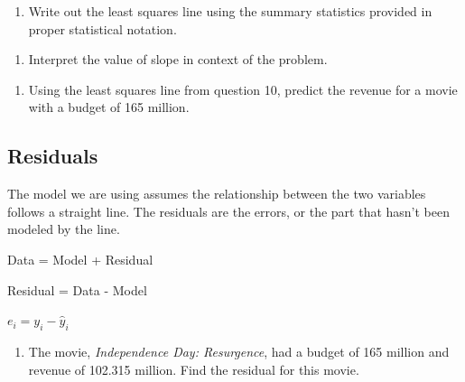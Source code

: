 \documentclass[
]{report}
\providecommand{\tightlist}{%
  \setlength{\itemsep}{0pt}\setlength{\parskip}{0pt}}
\begin{document}
\begin{enumerate}
\def\labelenumi{\arabic{enumi}.}
\setcounter{enumi}{9}
\tightlist
\item
  Write out the least squares line using the summary statistics provided in proper statistical notation.
\end{enumerate}

\vspace{.6in}

\begin{enumerate}
\def\labelenumi{\arabic{enumi}.}
\setcounter{enumi}{10}
\tightlist
\item
  Interpret the value of slope in context of the problem.
\end{enumerate}

\vspace{1in}

\begin{enumerate}
\def\labelenumi{\arabic{enumi}.}
\setcounter{enumi}{11}
\tightlist
\item
  Using the least squares line from question 10, predict the revenue for a movie with a budget of 165 million.
\end{enumerate}

\vspace{.6in}

\hypertarget{residuals}{%
\subsection*{Residuals}\label{residuals}}

The model we are using assumes the relationship between the two variables follows a straight line. The residuals are the errors, or the part that hasn't been modeled by the line.

\begin{center}
Data = Model + Residual

Residual = Data - Model

$e_i=y_i-\hat{y}_i$
\end{center}

\begin{enumerate}
\def\labelenumi{\arabic{enumi}.}
\setcounter{enumi}{12}
\tightlist
\item
  The movie, \emph{Independence Day: Resurgence}, had a budget of 165 million and revenue of 102.315 million. Find the residual for this movie.
\end{enumerate}
\end{document}

